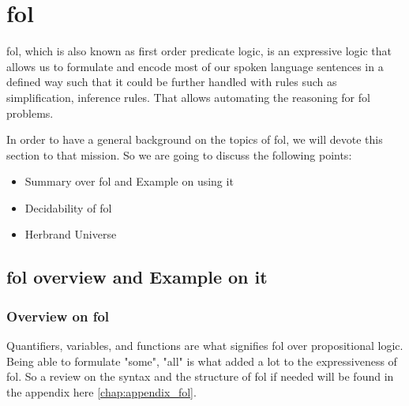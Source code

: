 \section{\acf{fol}} \label{sec:c2s1}

\ac{fol}, which is also known as first order predicate logic, is an expressive logic that allows us to formulate and encode most of our spoken language sentences in a defined way such that it could be further handled with rules such as simplification, inference rules. That allows automating the reasoning for \ac{fol} problems.


In order to have a general background on the topics of \ac{fol}, we will devote this section to that mission. So we are going to discuss the following points:
	
	\begin{itemize}
		\item Summary over \ac{fol} and Example on using it
		\item Decidability of \ac{fol}
		\item Herbrand Universe
	\end{itemize}	    

\begin{comment}
	We could represent formulas in \ac{fol} in so many forms. So \ref{sub:c2s1s1} will be devoted to that part of background.
\end{comment}



\subsection{\ac{fol} overview and Example on it}

\subsubsection{Overview on \ac{fol}}
Quantifiers, variables, and functions are what signifies \ac{fol} over propositional logic. Being able to formulate "some", "all" is what added a lot to the expressiveness of \ac{fol}. So a review on the syntax and the structure of \ac{fol} if needed will be found in the appendix here \ref{chap:appendix_fol}.


